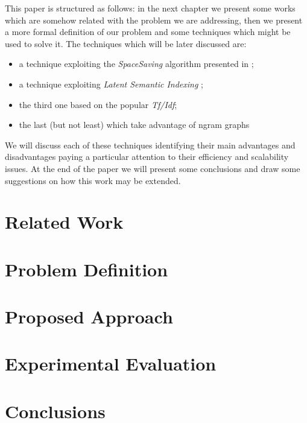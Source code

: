 \documentclass{acm_proc_article-sp-sigmod07}
\begin{document}
This paper is structured as follows: in the next chapter we present some works
which are somehow related with the problem we are addressing, then we present a more
formal definition of our problem and some techniques which might be
used to solve it. The techniques which will be later discussed are:
\begin{itemize}
	\item a technique exploiting the \emph{SpaceSaving} algorithm presented in
		\cite{SS};
	\item a technique exploiting \emph{Latent Semantic Indexing} \cite{LSA};
	\item the third one based on the popular \emph{Tf/Idf};
	\item the last (but not least) which take advantage of ngram graphs
		\cite{Ngram}
\end{itemize}
We will discuss each of these techniques identifying their main advantages and disadvantages paying a particular attention to their efficiency and scalability issues.
At the end of the paper we will present some conclusions and draw some suggestions on how this work may be extended.

\section{Related Work}


\section{Problem Definition}


\section{Proposed Approach}


\section{Experimental Evaluation}


\section{Conclusions}

\end{document}
